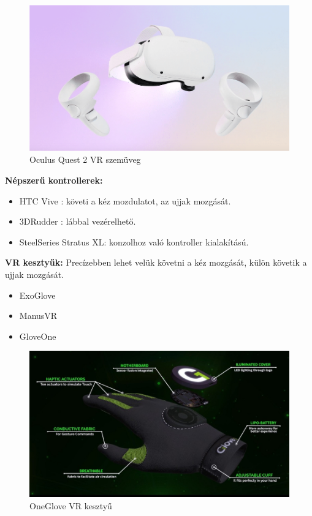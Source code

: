 \begin{figure}[htp]
    \centering
   	\includegraphics[width=5truecm, height=3.8truecm]{images/oculus.png}
	\caption{Oculus Quest 2 VR szemüveg}
\end{figure}


{\bf Népszerű kontrollerek:}
\begin{itemize}
\item HTC Vive : követi a kéz mozdulatot, az ujjak mozgását.
\item 3DRudder : lábbal vezérelhető.
\item SteelSeries Stratus XL: konzolhoz való kontroller kialakítású.
\end{itemize}

{\bf VR kesztyűk:}
Precízebben lehet velük követni a kéz mozgását, külön követik a ujjak mozgását.
\begin{itemize}
\item ExoGlove
\item ManusVR
\item GloveOne
\end{itemize}

\begin{figure}[htp]
    \centering
   	\includegraphics[width=5truecm, height=3.8truecm]{images/gloveone.jpg}
	\caption{OneGlove VR kesztyű}
\end{figure}

